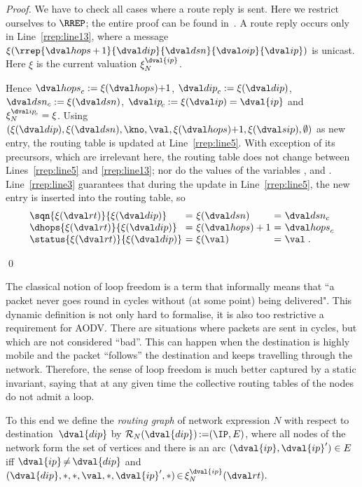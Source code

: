 \documentclass[envcountsame,envcountsect,orivec,runningheads]{llncs}
\begin{document}
\begin{proof}
We have to check all cases where a route reply is sent.
Here we restrict ourselves to $\RREP$; the entire proof can be found in~\cite[Prop. 7.10(b)]{TR11}.
A route reply occurs only in Line~\ref{rrep:line13},
where a message $\xi(\rrep{\hops\mathop{+}1}{\dip}{\dsn}{\oip}{\ip})$
is unicast. Here $\xi$ is the current valuation $\xiN{\dval{ip}}$.

Hence $\hopsc:=\xi(\hops)\mathord+1$,
$\dipc:=\xi(\dip)$, $\dsnc:=\xi(\dsn)$,
$\ipc:=\xi(\ip)=\dval{ip}$ and \mbox{$\xiN{\ipc}=\xi$}.
Using $(\xi(\dip),\xi(\dsn),\kno,\val,\xi(\hops)\mathord{+}1,\xi(\sip),\emptyset)$ as
new entry, the routing table is updated at Line~\ref{rrep:line5}.
With exception of its precursors, which are irrelevant here, the routing table
does not change between Lines~\ref{rrep:line5} and \ref{rrep:line13};
nor do the values of the variables {\hops}, {\dip} and {\dsn}.
Line~\ref{rrep:line3} guarantees that
during the update in Line~\ref{rrep:line5},
the new entry is inserted into the routing table, so
\[\begin{array}[b]{l@{~=~}l@{~=~}l}
\sqn{\xi(\rt)}{\xi(\dip)} & \xi(\dsn) & \dsnc\\
 \dhops{\xi(\rt)}{\xi(\dip)} & \xi(\hops)+1 & \hopsc\\
\status{\xi(\rt)}{\xi(\dip)} & \xi(\val) & \val\;.
\end{array}\]

\vspace{-1.9\abovedisplayskip}\qed
\end{proof}

The classical notion of loop freedom is a term that informally means
that ``a packet never goes round in cycles without (at some point)
being delivered". 
This dynamic definition is not only hard to formalise, 
it is also too restrictive a requirement for AODV\@. There are situations where 
packets are sent in cycles, but which are not considered  ``bad''.
This can happen when the destination is highly mobile 
and  the packet ``follows'' the destination and keeps travelling 
through the network. Therefore, the sense of loop freedom is much
better captured by a static invariant,
saying that at any given
time the collective routing tables of the nodes do not admit a loop.

\newcommand{\RG}[2]{\mathcal{R}_{#1}(#2)}
To this end we define the \emph{routing graph} of network expression $N$ with respect to
destination~$\dval{dip}$ by $\RG{N}{\dval{dip}}\mathop{:=}\linebreak[1](\IP,E)$, where
all nodes of the network form the set of vertices and there is an
arc $({\dval{ip}},{\dval{ip}}')\in E$ iff $\dval{ip}\mathop{\not=}\dval{dip}$ and
$
(\dval{dip},*,*,\val,*,\dval{ip}',*)\mathop{\in}\xiN{\dval{ip}}(\rt).
$
\end{document}
